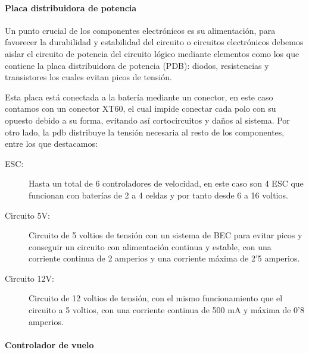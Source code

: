 \paragraph{Placa distribuidora de potencia}\label{SSS:PlacaDistribuidora}

Un punto crucial de los componentes electrónicos es su alimentación, para favorecer la durabilidad y estabilidad del circuito o circuitos electrónicos debemos aislar el circuito de potencia del circuito lógico mediante elementos como los que contiene la placa distribuidora de potencia (PDB): diodos, resistencias y transistores los cuales evitan picos de tensión.


Esta placa está conectada a la batería mediante un conector, en este caso contamos con un conector XT60, el cual impide conectar cada polo con su opuesto debido a su forma, evitando así cortocircuitos y daños al sistema.
Por otro lado, la \ac{pdb} distribuye la tensión necesaria al resto de los componentes, entre los que destacamos:



\begin{description}
        \item[ESC:] Hasta un total de 6 controladores de velocidad, en este caso son 4 ESC que funcionan con baterías de 2 a 4 celdas y por tanto desde 6 a 16 voltios.
        \item [Circuito 5V:] Circuito de 5 voltios de tensión con un sistema de BEC para evitar picos y conseguir un circuito con alimentación continua y estable, con una corriente continua de 2 amperios y una corriente máxima de 2'5 amperios.
        \item [Circuito 12V:] Circuito de 12 voltios de tensión, con el mismo funcionamiento que el circuito a 5 voltios, con una corriente continua de 500 mA y máxima de 0'8 amperios.
\end{description}


\paragraph{Controlador de vuelo}
\label{SSS:Controlador de vuelo}

